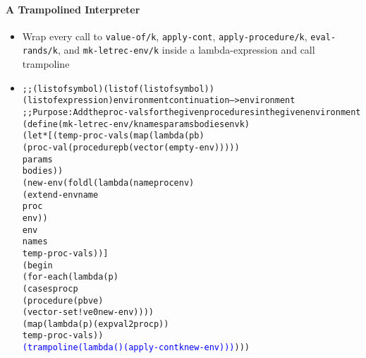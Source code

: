 \documentclass{beamer}
\begin{document}
\begin{frame}[fragile]
\framesubtitle{A Trampolined Interpreter}
\begin{tiny}
\begin{itemize}
\item<1-> Wrap every call to \texttt{value-of/k}, \texttt{apply-cont}, \texttt{apply-procedure/k}, \texttt{eval-rands/k}, and \texttt{mk-letrec-env/k} inside a lambda-expression and call trampoline

\item<1->
\begin{alltt}
;; (listof symbol) (listof (listof symbol)) (listof expression) environment continuation --> environment
;; Purpose: Add the proc-vals for the given procedures in the given environment
(define (mk-letrec-env/k names params bodies env k)
  (let* [(temp-proc-vals (map (lambda (p b)
                                (proc-val (procedure p b (vector (empty-env)))))
                              params
                              bodies))
         (new-env (foldl (lambda (name proc env)
                           (extend-env name
                                       proc
                                       env))
                         env
                         names
                         temp-proc-vals))]
    (begin
      (for-each (lambda (p)
                  (cases proc p
                    (procedure (p b ve)
                               (vector-set! ve 0 new-env))))
                (map (lambda (p) (expval2proc p))
                     temp-proc-vals))
      \textcolor{blue}{(trampoline (lambda () (apply-cont k new-env)))})))
\end{alltt}

\end{itemize}
\end{tiny}
\end{frame}
\end{document}
